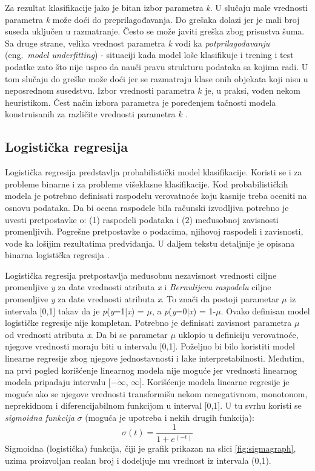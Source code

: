\documentclass[12pt,oneside]{memoir}
\begin{document}
Za rezultat klasifikacije jako je bitan izbor parametra \textit{k}. U slučaju male vrednosti parametra \textit{k} može doći do preprilagođavanja. Do grešaka dolazi jer je mali broj suseda uključen u razmatranje. Često se može javiti greška zbog prisustva šuma. Sa druge strane, velika vrednost parametra \textit{k} vodi ka \textit{potprilagođavanju} (eng.~\textit{model underfitting}) - situaciji kada model loše klasifikuje i trening i test podatke zato što nije uspeo da nauči pravu strukturu podataka sa kojima radi. U tom slučaju do greške može doći jer se razmatraju klase onih objekata koji nisu u neposrednom susedstvu. Izbor vrednosti parametra $k$ je, u praksi, vođen nekom heuristikom. Čest način izbora parametra je poređenjem tačnosti modela konstruisanih za različite vrednosti parametra $k$ \cite{mladen, mitic, aggarwal}.

\subsection{Logistička regresija}

Logistička regresija predstavlja probabilistički model klasifikacije. Koristi se i za probleme binarne i za probleme višeklasne klasifikacije. Kod probabilističkih modela je potrebno definisati raspodelu verovatnoće koju kasnije treba oceniti na osnovu podataka. Da bi ocena raspodele bila računski izvodljiva potrebno je uvesti pretpostavke o: (1) raspodeli podataka i (2) međusobnoj zavisnosti promenljivih. Pogrešne pretpostavke o podacima, njihovoj raspodeli i zavisnosti, vode ka lošijim rezultatima predviđanja. U daljem tekstu detaljnije je opisana binarna logistička regresija \cite{mladen}.

Logistička regresija pretpostavlja međusobnu nezavisnost vrednosti ciljne promenljive \textit{y} za date vrednosti atributa \textit{x} i \textit{Bernulijevu raspodelu} ciljne promenljive \textit{y} za date vrednosti atributa \textit{x}. To znači da postoji parametar  $\mu$ iz intervala [0,1] takav da je  \textit{p}(\textit{y}=1|\textit{x}) = $\mu$, a  \textit{p}(\textit{y}=0|\textit{x}) = 1-$\mu$. Ovako definisan model logističke regresije nije kompletan. Potrebno je definisati zavisnost parametra $\mu$ od vrednosti atributa \textit{x}. Da bi se parametar $\mu$ uklopio u definiciju verovatnoće, njegove vrednosti moraju biti u intervalu [0,1]. Poželjno bi bilo koristiti model linearne regresije zbog njegove jednostavnosti i lake interpretabilnosti. Međutim, na prvi pogled korišćenje linearnog modela nije moguće jer vrednosti linearnog modela pripadaju intervalu [$-\infty$, $\infty$]. Korišćenje modela linearne regresije je moguće ako se njegove vrednosti transformišu nekom nenegativnom, monotonom, neprekidnom i diferencijabilnom funkcijom u interval [0,1]. U tu svrhu koristi se \textit{sigmoidna funkcija} $\sigma$ (moguća je upotreba i nekih drugih funkcija):
$$ \sigma(t) = \frac{\mathrm{1}}{\mathrm{1} + e^{(- t)}} $$
Sigmoidna (logistička) funkcija, čiji je grafik prikazan na slici \ref{fig:sigmagraph}, uzima proizvoljan realan broj i dodeljuje mu vrednost iz intervala (0,1). 
\end{document}
